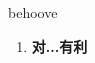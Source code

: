 
\begin{frame}
{\huge behoove}
\begin{center}
\begin{enumerate}\Large
  \item \textbf{对...有利}
\end{enumerate}
\end{center}
\end{frame}
